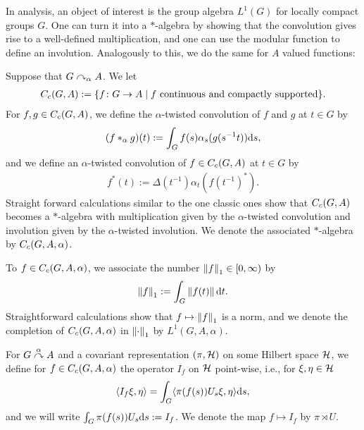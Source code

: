 
In analysis, an object of interest is the group algebra $L^1(G)$ for locally compact groups $G$. One can turn it into a $*$-algebra by showing that the convolution gives rise to a well-defined multiplication, and one can use the modular function to define an involution. Analogously to this, we do the same for $A$ valued functions:
\begin{definition}
	Suppose that $G \curvearrowright_\alpha A$. We let 
	\begin{align*}
		C_c(G,A):=\{ f \colon G \to A \mid f \text{ continuous and compactly supported}\}.
	\end{align*}
	For $f,g \in C_c(G,A)$, we define the $\alpha$-twisted convolution of $f$ and $g$ at $t \in G$ by
	\begin{align*}
		(f \ast_\alpha g)(t):= \int_G  f(s) \alpha_s(g(s^{-1}t)) \mathrm{d} s,
	\end{align*}
	and we define an $\alpha$-twisted convolution of $f \in C_c(G,A)$ at $t \in G$ by
	\begin{align*}
		f^*(t):=\Delta(t^{-1}) \alpha_t(f(t^{-1})^*).
	\end{align*}
	Straight forward calculations similar to the one classic ones show that $C_c(G,A)$ becomes a $*$-algebra with multiplication given by the $\alpha$-twisted convolution and involution given by the $\alpha$-twisted involution. We denote the associated $*$-algebra by $C_c(G,A,\alpha)$.
	
	To $f \in C_c(G,A,\alpha)$, we associate the number $\left\lVert f \right\rVert_1 \in [0, \infty)$ by
		\begin{align*}
			\left\lVert f \right\rVert_1 := \int_G \left\lVert f(t) \right\rVert \mathrm{d} t.
		\end{align*}
	Straightforward calculations show that $f \mapsto \left\lVert f \right\rVert_1$ is a norm, and we denote the completion of $C_c(G,A,\alpha)$ in $\left\lVert \cdot \right\rVert_1$ by $L^1(G,A,\alpha)$.
\end{definition}

For $G \stackrel{\alpha}{\curvearrowright} A$ and a covariant representation $(\pi,\mathcal{H})$ on some Hilbert space $\mathcal{H}$, we define for $f \in C_c(G,A,\alpha)$ the operator $I_{f}$ on $\mathcal{H}$ point-wise, i.e., for $\xi, \eta \in \mathcal{H}$
\begin{align*}
	\langle I_f \xi ,\eta \rangle = \int_G \langle \pi(f(s)) U_s \xi, \eta \rangle \mathrm{d} s,
\end{align*}
and we will write $\int_G \pi(f(s)) U_s \mathrm{d} s := I_f$. We denote the map $f \mapsto I_f$ by $\pi \rtimes U$.

